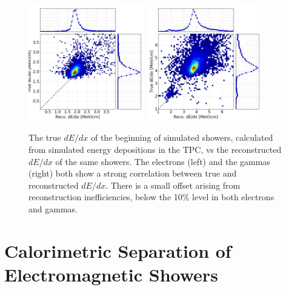 \begin{figure}[htb]
  \centering
  \includegraphics[width=0.45\textwidth]{emshower_figures/e_true_reco_dedx_4cm.png}
  \includegraphics[width=0.45\textwidth]{emshower_figures/p_true_reco_dedx_4cm.png}
  \caption{The true $dE/dx$ of the beginning of simulated showers, calculated from simulated energy depositions in the TPC, vs the reconstructed $dE/dx$ of the same showers.  The electrons (left) and the gammas (right) both show a strong correlation between true and reconstructed $dE/dx$. There is a small offset arising from reconstruction inefficiencies, below the 10\% level in both electrons and gammas.}
  \label{fig:true_dedx}
\end{figure}

\FloatBarrier

\section{\label{sec:argo_dedx} Calorimetric Separation of Electromagnetic Showers}

